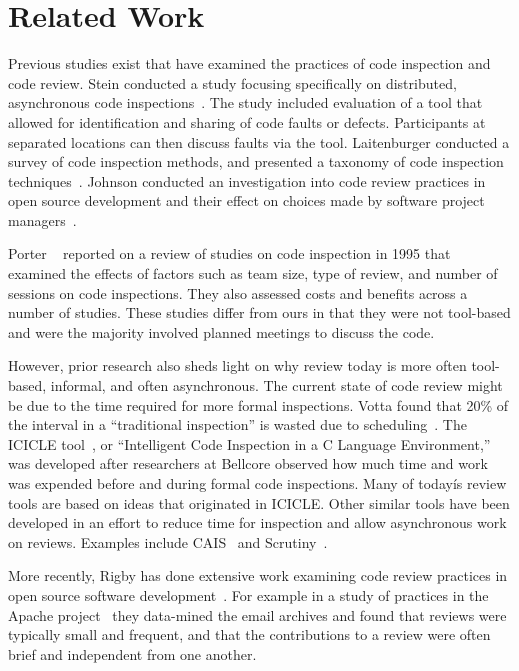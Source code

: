 
\section{Related Work} \label{sec:related_work}


Previous studies exist that have examined the practices of code inspection and
code review.  Stein \etal conducted a study focusing specifically on
distributed, asynchronous code inspections~\cite{stein1997casestudy}. The study included evaluation
of a tool that allowed for identification and sharing of code faults or
defects. Participants at separated locations can then discuss faults via the
tool. Laitenburger conducted a survey of code inspection methods, and presented
a taxonomy of code inspection techniques~\cite{laitenberger2002survey}. Johnson conducted
an investigation into code review practices in open source development and their
effect on choices made by software project managers~\cite{johnson2006collaboration}.

Porter \etal~\cite{porter1996review} reported on a review of studies on
code inspection in 1995 that examined the effects of factors such as team size,
type of review, and number of sessions on code inspections.  They also assessed
costs and benefits across a number of studies.  These studies differ from ours
in that they were not tool-based and were the majority involved planned
meetings to discuss the code.

However, prior research also sheds light on why review today is more often
tool-based, informal, and often asynchronous. The current state of code review
might be due to the time required for more formal inspections.  Votta found
that 20\% of the interval in a ``traditional inspection'' is wasted due to
scheduling~\cite{votta1993does}. The ICICLE tool~\cite{brothers1990icicle}, or ``Intelligent Code Inspection in a C Language Environment,'' was
developed after researchers at Bellcore observed how much time and work was
expended before and during formal code inspections. Many of todayís review
tools are based on ideas that originated in ICICLE.  Other similar tools have
been developed in an effort to reduce time for inspection and allow
asynchronous work on reviews.   Examples include CAIS~\cite{mashayekhi1994cais} 
and Scrutiny~\cite{gintell1993scrutiny}.

More recently, Rigby has done extensive work examining code review practices in
open source software development~\cite{rigby2012open}.  For example in
a study of practices in the Apache project~\cite{rigby2008open}
they data-mined the email archives and found that reviews were typically small
and frequent, and that the contributions to a review were often brief and
independent from one another.

